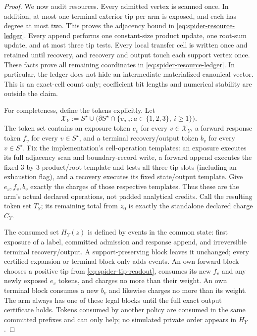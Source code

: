 \begin{proof}
We now audit resources.  Every admitted vertex is scanned once.  In addition,
at most one terminal exterior tip per arm is exposed, and each has degree at
most two.  This proves the adjacency bound in
\cref{eq:spider-resource-ledger}.  Every append performs one constant-size
product update, one root-sum update, and at most three tip tests.  Every local
transfer cell is written once and retained until recovery, and recovery and
output touch each support vertex once.  These facts prove all remaining
coordinates in \cref{eq:spider-resource-ledger}.  In particular, the ledger
does not hide an intermediate materialized canonical vector.  This is an
exact-cell count only; coefficient bit lengths and numerical stability are
outside the claim.

For completeness, define the tokens explicitly.  Let
\begin{equation*}
 \mathcal X_Y
 :=S^\star\cup\bigl(\partial S^\star\cap
       \{v_{a,i}:a\in\{1,2,3\},\ i\geq1\}\bigr).
\end{equation*}
The token set contains an exposure token $e_v$ for every $v\in\mathcal X_Y$,
a forward response token $f_v$ for every $v\in S^\star$, and a terminal
recovery/output token $b_v$ for every $v\in S^\star$.  Fix the implementation's
cell-operation templates: an exposure executes its full adjacency scan and
boundary-record write, a forward append executes the fixed $3$-by-$3$
product/root template and tests all three tip slots (including an exhaustion
flag), and a recovery executes its fixed state/output template.  Give
$e_v,f_v,b_v$ exactly the charges of those respective templates.  Thus these
are the arm's actual declared operations, not padded analytical credits.  Call
the resulting token set $T_Y$; its remaining total from $z_0$ is exactly the
standalone declared charge $C_Y$.

The consumed set $H_Y(z)$ is defined by events in the common state: first
exposure of a label, committed admission and response append, and irreversible
terminal recovery/output.  A support-preserving block leaves it unchanged;
every certified expansion or terminal block only adds events.  An own forward
block chooses a positive tip from \cref{eq:spider-tip-readout}, consumes its
new $f_v$ and any newly exposed $e_v$ tokens, and charges no more than their
weight.  An own terminal block consumes a new $b_v$ and likewise charges no
more than its weight.  The arm always has one of these legal blocks until the
full exact output certificate holds.  Tokens consumed by another policy are
consumed in the same committed prefixes and can only help; no simulated
private order appears in $H_Y$.


\end{proof}
